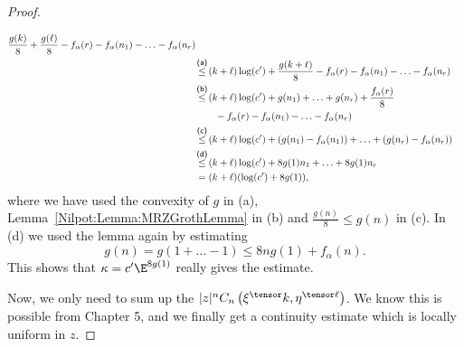 \begin{proof}
\begin{subproof}
\begin{align*}
	       	\frac{g(k)}{8}
	       	+
	       	\frac{g(\ell)}{8}
	       	-
	       	f_{\alpha}(r)
	       	-
	       	f_{\alpha}(n_1)
	       	- \ldots -
	       	f_{\alpha}(n_r)
	       	\\
	       	& \ot{(a)}{\leq}
	       	(k + \ell) \log(c')
	       	+
	       	\frac{g(k + \ell)}{8}
			-
	       	f_{\alpha}(r)
	       	-
	       	f_{\alpha}(n_1)
	       	- \ldots -
	       	f_{\alpha}(n_r)
	       	\\
	       	& \ot{(b)}{\leq}
			(k + \ell) \log(c')
	       	+
	       	g(n_1) + \ldots + g(n_r)
	       	+
	       	\frac{f_{\alpha}(r)}{8}
	       	\\
	       	& \qquad
	       	-
	       	f_{\alpha}(r)
	       	-
	       	f_{\alpha}(n_1)
	       	- \ldots -
	       	f_{\alpha}(n_r)
	       	\\
	       	& \ot{(c)}{\leq}
	       	(k + \ell) \log(c')
	       	+
	       	\left( g(n_1) - f_{\alpha}(n_1) \right)
	       	+ \ldots + 
	       	\left( g(n_r) - f_{\alpha}(n_r) \right)
	       	\\
	       	& \ot{(d)}{\leq}
	       	(k + \ell) \log(c')
	       	+
	       	8 g(1) n_1
	       	+ \ldots + 
	       	8 g(1) n_r
	       	\\
	       	& =
	       	(k + \ell)
	       	(\log(c') + 8 g(1)),
    		\end{align*}
    		where we have used the convexity of $g$ in (a), 
    		Lemma~\ref{Nilpot:Lemma:MRZGrothLemma} in (b) and $\frac{g(n)}{8} \leq 
    		g(n)$ in (c). In (d) we used the lemma again by estimating
    		\begin{equation*}
    			g(n)
    			=
    			g(1 + \ldots - 1)
    			\leq
    			8 n g(1) + f_{\alpha}(n).
    		\end{equation*}
    		This shows that $\kappa = c' \E^{8 g(1)}$ really gives the estimate.
    \end{subproof}
    Now, we only need to sum up the $|z|^n C_n\left( \xi^{\tensor} k, 
    \eta^{\tensor \ell} \right)$. We know this is possible from Chapter 5, and 
    we finally get a continuity estimate which is locally uniform in $z$.
\end{proof}


